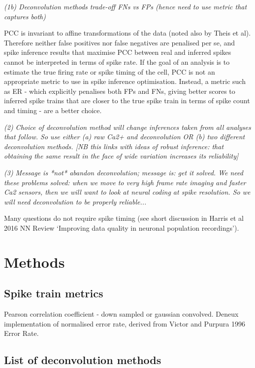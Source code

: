 \documentclass[a4paper]{article}
\begin{document}
\emph{(1b) Deconvolution methods trade-off FNs vs FPs (hence need to use metric that captures both)}

PCC is invariant to affine transformations of the data (noted also by Theis et al). Therefore neither false positives nor false negatives are penalised per se, and spike inference results that maximise PCC between real and inferred spikes cannot be interpreted in terms of spike rate. If the goal of an analysis is to estimate the true firing rate or spike timing of the cell, PCC is not an appropriate metric to use in spike inference optimisation. Instead, a metric such as ER - which explicitly penalises both FPs and FNs, giving better scores to inferred spike trains that are closer to the true spike train in terms of spike count and timing - are a better choice.


\emph{(2) Choice of deconvolution method will change inferences taken from all analyses that follow. So use either (a) raw Ca2+ and deconvolution OR (b) two different deconvolution methods. [NB this links with ideas of robust inference: that obtaining the same result in the face of wide variation increases its reliability]}

\emph{(3) Message is *not* abandon deconvolution; message is: get it solved. We need these problems solved: when we move to very high frame rate imaging and faster Ca2 sensors, then we will want to look at neural coding at spike resolution. So we will need deconvolution to be properly reliable...}

Many questions do not require spike timing (see short discussion in Harris et al 2016 NN Review `Improving data quality in neuronal population recordings'). 

\clearpage
\section{Methods}

\subsection*{Spike train metrics}
Pearson correlation coefficient - down sampled or gaussian convolved.
Deneux implementation of normalised error rate, derived from Victor and Purpura 1996 Error Rate.


\subsection*{List of deconvolution methods}
\end{document}

